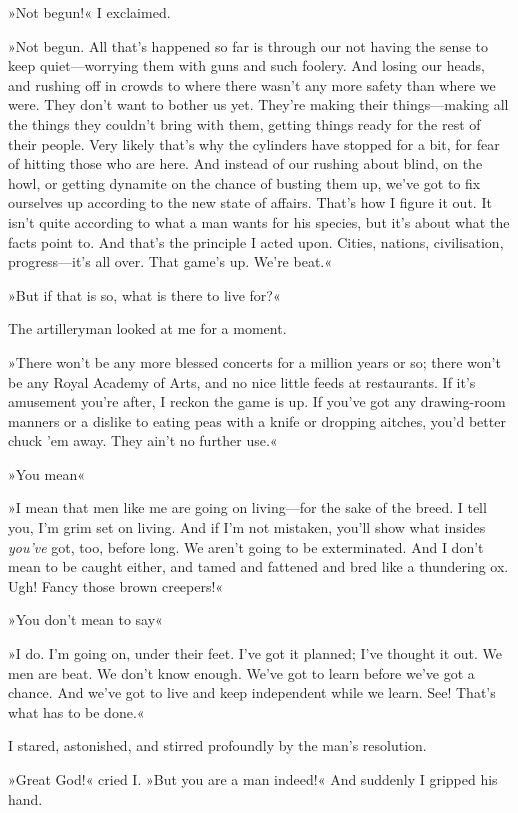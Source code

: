 »Not begun!« I exclaimed.

»Not begun. All that's happened so far is through our not having the sense to keep quiet—worrying them with guns and such foolery. And losing our heads, and rushing off in crowds to where there wasn't any more safety than where we were. They don't want to bother us yet. They're making their things—making all the things they couldn't bring with them, getting things ready for the rest of their people. Very likely that's why the cylinders have stopped for a bit, for fear of hitting those who are here. And instead of our rushing about blind, on the howl, or getting dynamite on the chance of busting them up, we've got to fix ourselves up according to the new state of affairs. That's how I figure it out. It isn't quite according to what a man wants for his species, but it's about what the facts point to. And that's the principle I acted upon. Cities, nations, civilisation, progress—it's all over. That game's up. We're beat.«

»But if that is so, what is there to live for?«

The artilleryman looked at me for a moment.

»There won't be any more blessed concerts for a million years or so; there won't be any Royal Academy of Arts, and no nice little feeds at restaurants. If it's amusement you're after, I reckon the game is up. If you've got any drawing-room manners or a dislike to eating peas with a knife or dropping aitches, you'd better chuck 'em away. They ain't no further use.«

»You mean\longdash«

»I mean that men like me are going on living—for the sake of the breed. I tell you, I'm grim set on living. And if I'm not mistaken, you'll show what insides \textit{you've} got, too, before long. We aren't going to be exterminated. And I don't mean to be caught either, and tamed and fattened and bred like a thundering ox. Ugh! Fancy those brown creepers!«

»You don't mean to say\longdash«

»I do. I'm going on, under their feet. I've got it planned; I've thought it out. We men are beat. We don't know enough. We've got to learn before we've got a chance. And we've got to live and keep independent while we learn. See! That's what has to be done.«

I stared, astonished, and stirred profoundly by the man's resolution.

»Great God!« cried I\@. »But you are a man indeed!« And suddenly I gripped his hand.

